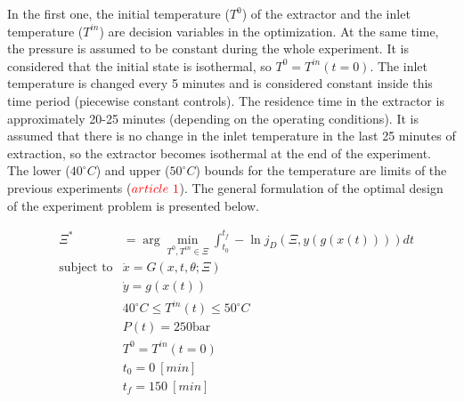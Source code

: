 \documentclass[../Article_Design_of_Experiment.tex]{subfiles}
\begin{document}
	In the first one, the initial temperature ($T^0$) of the extractor and the inlet temperature ($T^{in}$) are decision variables in the optimization. At the same time, the pressure is assumed to be constant during the whole experiment. It is considered that the initial state is isothermal, so $T^0=T^{in}(t=0)$. The inlet temperature is changed every 5 minutes and is considered constant inside this time period (piecewise constant controls). The residence time in the extractor is approximately 20-25 minutes (depending on the operating conditions). It is assumed that there is no change in the inlet temperature in the last 25 minutes of extraction, so the extractor becomes isothermal at the end of the experiment. The lower ($40^\circ C$) and upper ($50^\circ C$) bounds for the temperature are limits of the previous experiments (${\color{red}article~1}$). The general formulation of the optimal design of the experiment problem is presented below.
	
	{\footnotesize
	\begin{equation}
		\begin{aligned} 
			&\Xi^* &= \arg \min_{ T^0, T^{in} \in \Xi} \int_{t_0}^{t_f} - \ln j_D(\Xi,y(g(x(t)))) dt  \\
			&\text{subject to}
			& \dot{x} = G(x,t,\theta;\Xi) \\
			&& \dot{y} = g(x(t)) \\
			&& 40^\circ C \leq T^{in}(t) \leq 50^\circ C \\
			&& P(t) = 250 \text{bar} \\
			&& T^{0} = T^{in}(t=0) \\
			&& t_0=0~[min] \\
			&& t_f=150~[min] \\
		\end{aligned}
	\end{equation} } 
	
\end{document}
